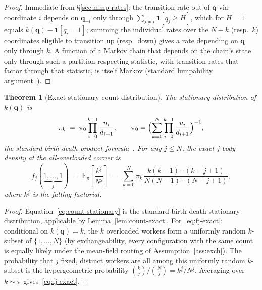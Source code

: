 \documentclass[11pt,a4paper]{report}
\newtheorem{theorem}{Theorem}[section]
\begin{document}
\begin{proof}
Immediate from \S\ref{sec:mmp-rates}: the transition rate out of
$\mathbf{q}$ via coordinate $i$ depends on $\mathbf{q}_{-i}$ only
through $\sum_{j\neq i}\mathbf{1}[q_j\geq H]$, which for $H=1$ equals
$k(\mathbf{q}) - \mathbf{1}[q_i=1]$; summing the individual rates over
the $N-k$ (resp.\ $k$) coordinates eligible to transition up (resp.\
down) gives a rate depending on $\mathbf{q}$ only through $k$. A
function of a Markov chain that depends on the chain's state only
through such a partition-respecting statistic, with transition rates
that factor through that statistic, is itself Markov (standard
lumpability argument~\cite{norris1997}).
\end{proof}

\begin{theorem}[Exact stationary count distribution]
\label{thm:count-chain-exact}
The stationary distribution of $k(\mathbf{q})$ is
\begin{equation}
  \pi_k \;=\; \pi_0 \prod_{i=0}^{k-1} \frac{u_i}{d_{i+1}},
  \qquad
  \pi_0 = \Bigl(\sum_{k=0}^N \prod_{i=0}^{k-1}\frac{u_i}{d_{i+1}}\Bigr)^{-1},
  \label{eq:count-stationary}
\end{equation}
the standard birth-death product formula~\cite{norris1997}. For any
$j \leq N$, the exact $j$-body density at the all-overloaded corner is
\begin{equation}
  f_j(\underbrace{1,\ldots,1}_j)
  \;=\;
  \mathbb{E}_\pi\!\left[\frac{k^{\underline{j}}}{N^{\underline{j}}}\right]
  \;=\;
  \sum_{k=0}^N \pi_k\,\frac{k(k-1)\cdots(k-j+1)}{N(N-1)\cdots(N-j+1)},
  \label{eq:fj-exact}
\end{equation}
where $k^{\underline{j}}$ is the falling factorial.
\end{theorem}

\begin{proof}
Equation~\eqref{eq:count-stationary} is the standard birth-death
stationary distribution, applicable by Lemma~\ref{lem:count-exact}.
For~\eqref{eq:fj-exact}: conditional on $k(\mathbf{q}) = k$, the $k$
overloaded workers form a uniformly random $k$-subset of
$\{1,\ldots,N\}$ (by exchangeability, every configuration with the
same count is equally likely under the mean-field routing of
Assumption~\ref{ass:exch}). The probability that $j$ fixed, distinct
workers are all among this uniformly random $k$-subset is the
hypergeometric probability $\binom{k}{j}/\binom{N}{j} =
k^{\underline{j}}/N^{\underline{j}}$. Averaging over $k \sim \pi$
gives~\eqref{eq:fj-exact}.
\end{proof}
\end{document}
